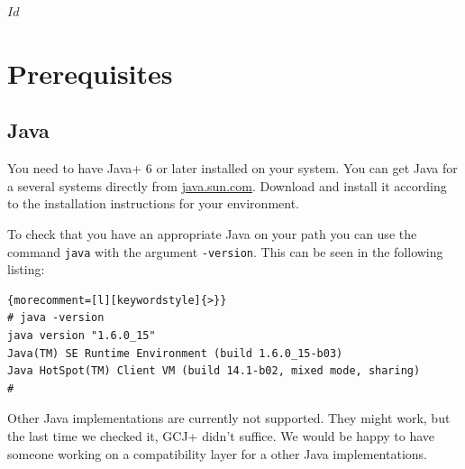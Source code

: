\SVN$Id$
\chapter{Prerequisites}

\section{Java}

You need to have \+Java+ 6 or later installed on your system. You can
get Java for a several systems directly from \url{java.sun.com}.
Download and install it according to the installation instructions for
your environment.

To check that you have an appropriate Java on your path you can use
the command \texttt{java} with the argument \texttt{-version}. This
can be seen in the following listing:

%
\begin{lstlisting}{morecomment=[l][keywordstyle]{>}}
# java -version
java version "1.6.0_15"
Java(TM) SE Runtime Environment (build 1.6.0_15-b03)
Java HotSpot(TM) Client VM (build 14.1-b02, mixed mode, sharing)
#
\end{lstlisting}

Other Java implementations are currently not supported. They might
work, but the last time we checked it, \+GCJ+ didn't suffice. We would
be happy to have someone working on a compatibility layer for a other
Java implementations.


